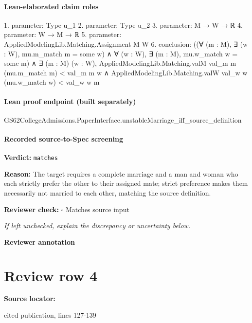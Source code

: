 \documentclass[10pt]{article}
\newcommand{\reviewerbox}{%
  \par\noindent\fbox{\parbox{0.96\linewidth}{\rule{0pt}{0.38in}}}\par
}
\newcommand{\reviewmatch}[1]{%
  \par\noindent\textbf{Reviewer check:} $\square$\; #1\par
  \noindent\emph{If left unchecked, explain the discrepancy or uncertainty below.}\par
}
\begin{document}
\paragraph{Lean-elaborated claim roles}\begin{ReviewVerbatim}
1. parameter: Type u_1
2. parameter: Type u_2
3. parameter: M → W → ℝ
4. parameter: W → M → ℝ
5. parameter: AppliedModelingLib.Matching.Assignment M W
6. conclusion: ((∀ (m : M), ∃ (w : W), mu.m_match m = some w) ∧ ∀ (w : W), ∃ (m : M), mu.w_match w = some m) ∧
  ∃ (m : M) (w : W),
    AppliedModelingLib.Matching.valM val_m m (mu.m_match m) < val_m m w ∧
      AppliedModelingLib.Matching.valW val_w w (mu.w_match w) < val_w w m
\end{ReviewVerbatim}

\paragraph{Lean proof endpoint (built separately)}\begin{ReviewVerbatim}
GS62CollegeAdmissions.PaperInterface.unstableMarriage_iff_source_definition
\end{ReviewVerbatim}

\paragraph{Recorded source-to-Spec screening}
\textbf{Verdict:} \texttt{matches}
\\
{\raggedright
\textbf{Reason:} The target requires a complete marriage and a man and woman who each strictly prefer the other to their assigned mate;\allowbreak{} strict preference makes them necessarily not married to each other, matching the source definition.\allowbreak{}
\par}
\reviewmatch{Matches source input}
\noindent\textbf{Reviewer annotation}\par
\reviewerbox
\clearpage
\hypertarget{source-claim-e6bf09e833b5d546}{}
\section*{Review row 4}
\textbf{Source locator:} {\footnotesize\raggedright cited publication, lines 127-\allowbreak{}139\par}
\end{document}
